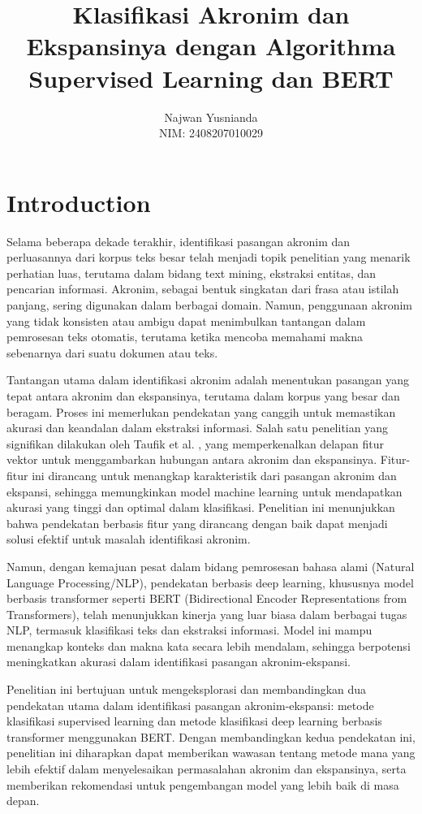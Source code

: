 \documentclass{article}\usepackage{float}
\title{Klasifikasi Akronim dan Ekspansinya dengan Algorithma Supervised Learning dan BERT}
\author{Najwan Yusnianda \\ NIM: 2408207010029}
\date{}
\begin{document}
\maketitle



\section{Introduction}

Selama beberapa dekade terakhir, identifikasi pasangan akronim dan perluasannya dari korpus teks besar telah menjadi topik penelitian yang menarik perhatian luas, terutama dalam bidang text mining, ekstraksi entitas, dan pencarian informasi. Akronim, sebagai bentuk singkatan dari frasa atau istilah panjang, sering digunakan dalam berbagai domain. Namun, penggunaan akronim yang tidak konsisten atau ambigu dapat menimbulkan tantangan dalam pemrosesan teks otomatis, terutama ketika mencoba memahami makna sebenarnya dari suatu dokumen atau teks.

Tantangan utama dalam identifikasi akronim adalah menentukan pasangan yang tepat antara akronim dan ekspansinya, terutama dalam korpus yang besar dan beragam. Proses ini memerlukan pendekatan yang canggih untuk memastikan akurasi dan keandalan dalam ekstraksi informasi.
Salah satu penelitian yang signifikan dilakukan oleh Taufik et al. \cite{ref1}, yang memperkenalkan delapan fitur vektor untuk menggambarkan hubungan antara akronim dan ekspansinya. Fitur-fitur ini dirancang untuk menangkap karakteristik dari pasangan akronim dan ekspansi, sehingga memungkinkan model machine learning untuk mendapatkan akurasi yang tinggi dan optimal dalam klasifikasi. Penelitian ini menunjukkan bahwa pendekatan berbasis fitur yang dirancang dengan baik dapat menjadi solusi efektif untuk masalah identifikasi akronim.

Namun, dengan kemajuan pesat dalam bidang pemrosesan bahasa alami (Natural Language Processing/NLP), pendekatan berbasis deep learning, khususnya model berbasis transformer seperti BERT (Bidirectional Encoder Representations from Transformers), telah menunjukkan kinerja yang luar biasa dalam berbagai tugas NLP, termasuk klasifikasi teks dan ekstraksi informasi. Model ini mampu menangkap konteks dan makna kata secara lebih mendalam, sehingga berpotensi meningkatkan akurasi dalam identifikasi pasangan akronim-ekspansi.

Penelitian ini bertujuan untuk mengeksplorasi dan membandingkan dua pendekatan utama dalam identifikasi pasangan akronim-ekspansi: metode klasifikasi supervised learning dan metode klasifikasi deep learning berbasis transformer menggunakan BERT. Dengan membandingkan kedua pendekatan ini, penelitian ini diharapkan dapat memberikan wawasan tentang metode mana yang lebih efektif dalam menyelesaikan permasalahan akronim dan ekspansinya, serta memberikan rekomendasi untuk pengembangan model yang lebih baik di masa depan.
\end{document}
